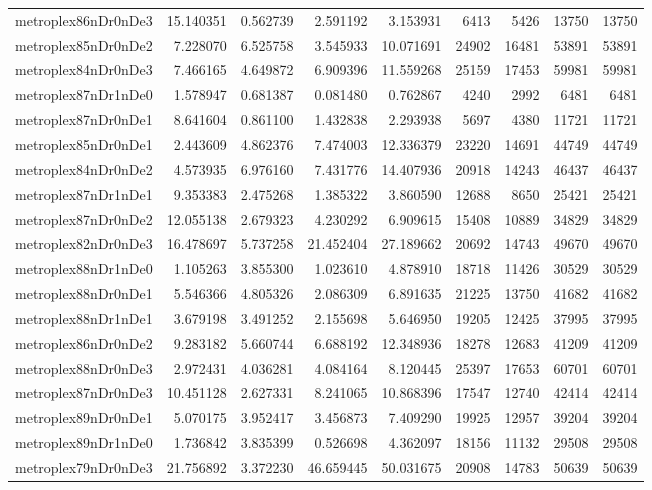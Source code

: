 \begin{longtable}{|l|r|r|r|r|r|r|r|r|}
metroplex86nDr0nDe3 & 15.140351 & 0.562739 & 2.591192 & 3.153931 & 6413 & 5426 & 13750 & 13750 \\
metroplex85nDr0nDe2 & 7.228070 & 6.525758 & 3.545933 & 10.071691 & 24902 & 16481 & 53891 & 53891 \\
metroplex84nDr0nDe3 & 7.466165 & 4.649872 & 6.909396 & 11.559268 & 25159 & 17453 & 59981 & 59981 \\
metroplex87nDr1nDe0 & 1.578947 & 0.681387 & 0.081480 & 0.762867 & 4240 & 2992 & 6481 & 6481 \\
metroplex87nDr0nDe1 & 8.641604 & 0.861100 & 1.432838 & 2.293938 & 5697 & 4380 & 11721 & 11721 \\
metroplex85nDr0nDe1 & 2.443609 & 4.862376 & 7.474003 & 12.336379 & 23220 & 14691 & 44749 & 44749 \\
metroplex84nDr0nDe2 & 4.573935 & 6.976160 & 7.431776 & 14.407936 & 20918 & 14243 & 46437 & 46437 \\
metroplex87nDr1nDe1 & 9.353383 & 2.475268 & 1.385322 & 3.860590 & 12688 & 8650 & 25421 & 25421 \\
metroplex87nDr0nDe2 & 12.055138 & 2.679323 & 4.230292 & 6.909615 & 15408 & 10889 & 34829 & 34829 \\
metroplex82nDr0nDe3 & 16.478697 & 5.737258 & 21.452404 & 27.189662 & 20692 & 14743 & 49670 & 49670 \\
metroplex88nDr1nDe0 & 1.105263 & 3.855300 & 1.023610 & 4.878910 & 18718 & 11426 & 30529 & 30529 \\
metroplex88nDr0nDe1 & 5.546366 & 4.805326 & 2.086309 & 6.891635 & 21225 & 13750 & 41682 & 41682 \\
metroplex88nDr1nDe1 & 3.679198 & 3.491252 & 2.155698 & 5.646950 & 19205 & 12425 & 37995 & 37995 \\
metroplex86nDr0nDe2 & 9.283182 & 5.660744 & 6.688192 & 12.348936 & 18278 & 12683 & 41209 & 41209 \\
metroplex88nDr0nDe3 & 2.972431 & 4.036281 & 4.084164 & 8.120445 & 25397 & 17653 & 60701 & 60701 \\
metroplex87nDr0nDe3 & 10.451128 & 2.627331 & 8.241065 & 10.868396 & 17547 & 12740 & 42414 & 42414 \\
metroplex89nDr0nDe1 & 5.070175 & 3.952417 & 3.456873 & 7.409290 & 19925 & 12957 & 39204 & 39204 \\
metroplex89nDr1nDe0 & 1.736842 & 3.835399 & 0.526698 & 4.362097 & 18156 & 11132 & 29508 & 29508 \\
metroplex79nDr0nDe3 & 21.756892 & 3.372230 & 46.659445 & 50.031675 & 20908 & 14783 & 50639 & 50639 \\

\end{longtable}
